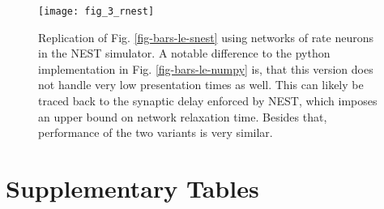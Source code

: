 \begin{figure}[h!]
  \centering
  \texttt{[image: fig\_3\_rnest]}
  \caption[Replication of Fig. \ref{fig-bars-le-snest} using networks of rate neurons in the NEST simulator]{Replication
    of Fig. \ref{fig-bars-le-snest} using networks of rate neurons in the NEST simulator. A notable difference to the
    python implementation in Fig. \ref{fig-bars-le-numpy} is, that this version does not handle very low presentation
    times as well. This can likely be traced back to the synaptic delay enforced by NEST, which imposes an upper bound
    on network relaxation time. Besides that, performance of the two variants is very similar.}
  \label{fig-bars-le-rnest}
\end{figure}



\clearpage

\section{Supplementary Tables}



\renewcommand{\thetable}{S\arabic{table}}


